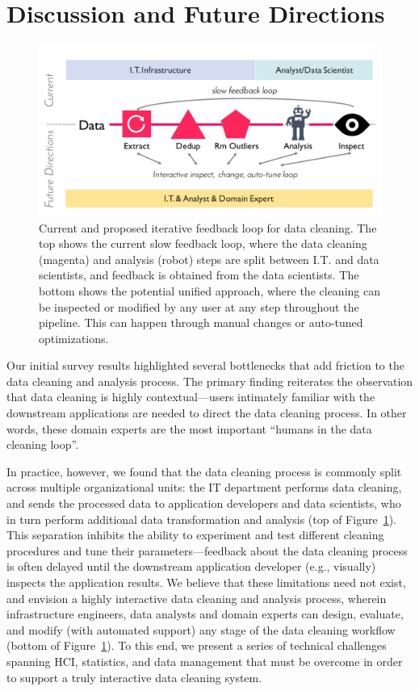 \section{Discussion and Future Directions}\label{sec:future}


\begin{figure}[ht]
  \centering
  \includegraphics[width=.95\columnwidth]{datafigs/arch}
  \caption{Current and proposed iterative feedback loop for data cleaning.  
  The top shows the current slow feedback loop, where the data cleaning (magenta) and analysis (robot) steps are split between I.T. and data scientists, and feedback is obtained from the data scientists. 
  The bottom shows the potential unified approach, where the cleaning can be inspected or modified by any user at any step throughout the pipeline.  This can happen through manual changes or auto-tuned optimizations.
  }
  \label{f:arch}
\end{figure}

Our initial survey results highlighted several bottlenecks that add friction to the data cleaning and analysis process.
The primary finding reiterates the observation that data cleaning is highly contextual---users intimately familiar with the downstream applications are needed to direct the data cleaning process.  In other words, these domain experts are the most important ``humans in the data cleaning loop''.  

In practice, however, we found that the data cleaning process is commonly split across multiple organizational units: the IT department performs data cleaning, and sends the processed data to application developers and data scientists, who in turn perform additional data transformation and analysis (top of Figure~\ref{f:arch}).  This separation inhibits the ability to experiment and test different cleaning procedures and tune their parameters---feedback about the data cleaning process is often delayed until the downstream application developer (e.g., visually) inspects the application results.  We believe that these limitations need not exist, and envision a highly interactive data cleaning and analysis process, wherein infrastructure engineers, data analysts and domain experts can design, evaluate, and modify (with automated support) any stage of the data cleaning workflow (bottom of Figure~\ref{f:arch}). To this end, we present a series of technical challenges spanning HCI, statistics, and data management that must be overcome in order to support a truly interactive data cleaning system.

